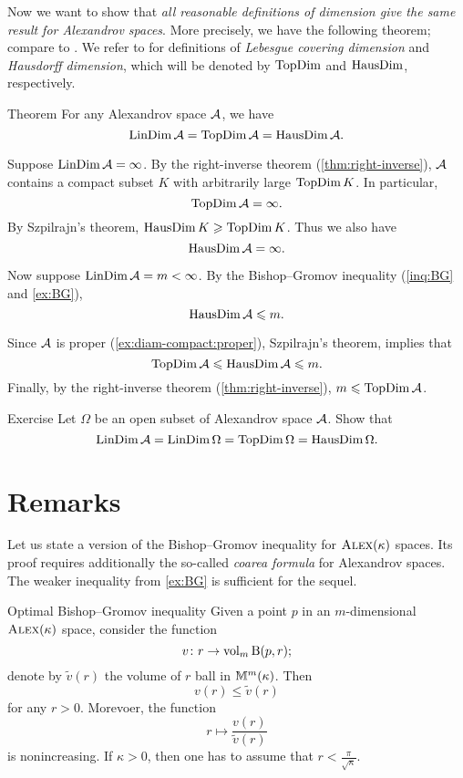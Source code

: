 Now we want to show that \textit{all reasonable definitions of dimension give the same result for Alexandrov spaces}.
More precisely, we have the following theorem; compare to \cite[15.16]{alexander-kapovitch-petrunin2024}.
We refer to \cite{hurewicz-wallman} for definitions of \emph{Lebesgue covering dimension} and \emph{Hausdorff dimension}, which will be denoted by $\mathop{\rm TopDim}\nolimits$ and
$\mathop{\rm HausDim}\nolimits$, respectively.

\begin{thm}{Theorem}\label{thm:dim=dim}
For any Alexandrov space $\mathcal{A}$, we have
\[\mathop{\rm LinDim}\nolimits \mathcal{A}=\mathop{\rm TopDim}\nolimits \mathcal{A}=\mathop{\rm HausDim}\nolimits \mathcal{A}.\]
\end{thm}

Suppose $\mathop{\rm LinDim}\nolimits \mathcal{A}=\infty$.
By the right-inverse theorem (\ref{thm:right-inverse}), $\mathcal{A}$ contains a compact subset $K$ with  arbitrarily large $\mathop{\rm TopDim}\nolimits K$.
In particular,
\[\mathop{\rm TopDim}\nolimits\mathcal{A}=\infty.\] 
By Szpilrajn's theorem,
$\mathop{\rm HausDim}\nolimits K\geqslant \mathop{\rm TopDim}\nolimits K$.
Thus we also have 
\[\mathop{\rm HausDim}\nolimits\mathcal{A}=\infty.\]

Now suppose $\mathop{\rm LinDim}\nolimits \mathcal{A}=m<\infty$.
By the Bishop--Gromov inequality (\ref{inq:BG} and \ref{ex:BG}), 
\[\mathop{\rm HausDim}\nolimits\mathcal{A}\leqslant m.\]

Since $\mathcal{A}$ is proper (\ref{ex:diam-compact:proper}),
Szpilrajn's theorem, implies that
\[\mathop{\rm TopDim}\nolimits\mathcal{A}\leqslant \mathop{\rm HausDim}\nolimits\mathcal{A}\leqslant m.\]
Finally, by the right-inverse theorem (\ref{thm:right-inverse}), $m\leqslant\mathop{\rm TopDim}\nolimits\mathcal{A}$.
\qeds

\begin{thm}{Exercise}\label{ex:dim=dim}
Let $\Omega$ be an open subset of Alexandrov space $\mathcal{A}$.
Show that 
\[\mathop{\rm LinDim}\nolimits \mathcal{A}=\mathop{\rm LinDim}\nolimits \Omega=\mathop{\rm TopDim}\nolimits \Omega=\mathop{\rm HausDim}\nolimits \Omega.\]
\end{thm}

\section{Remarks}

Let us state a version of the Bishop--Gromov inequality for $\textsc{Alex}(\kappa)$ spaces.
Its proof requires additionally the so-called \textit{coarea formula} for Alexandrov spaces. 
The weaker inequality from \ref{ex:BG} is sufficient for the sequel.

\begin{thm}{Optimal Bishop--Gromov inequality}\label{inq:BG+}
Given a point $p$ in an $m$-dimensional $\textsc{Alex}(\kappa)$ space,
consider the function
\[v\colon r\to\operatorname{\rm vol}\nolimits_m\mathrm{B}{}(p,r);\]
denote by $\tilde v(r)$ the volume of $r$ ball in $\mathbb{M}^m(\kappa)$.
Then 
\[v(r)\le \tilde v(r)\]
for any $r>0$.
Morevoer, the function
\[r\mapsto \frac{v(r)}{\tilde v(r)}\] is nonincreasing.
If $\kappa>0$, then one has to assume that $r<\tfrac\pi{\sqrt\kappa}$.
\end{thm}

